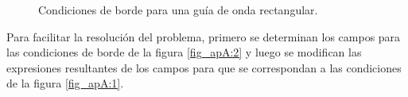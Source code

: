 \begin{figure} [H]
\centering 
{}
\caption{Condiciones de borde para una guía de onda rectangular.}
\label{grup_fig_apA:1}
\end{figure}
Para facilitar la resolución del problema, primero se determinan los campos para las condiciones de borde de la figura \ref{fig_apA:2} y luego se modifican las expresiones resultantes de los campos para que se correspondan a las condiciones de la figura \ref{fig_apA:1}.

